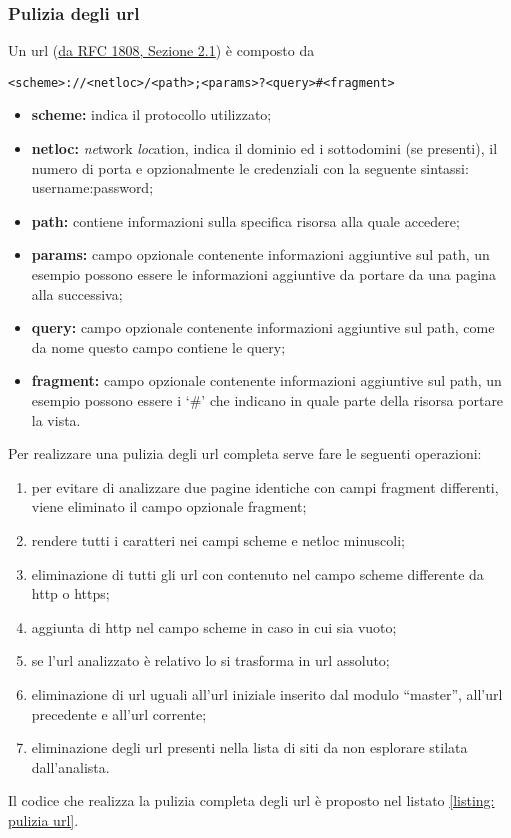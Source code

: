 \subsubsection{Pulizia degli url}
Un url (\href{https://datatracker.ietf.org/doc/html/rfc1808.html#section-2.1}{da RFC 1808, Sezione 2.1}) è composto da \newline
\centerline{\texttt{<scheme>://<netloc>/<path>;<params>?<query>\#<fragment>}}
\newline
\begin{itemize}
	\item \textbf{scheme:} indica il protocollo utilizzato;
	\item \textbf{netloc:} \textit{ne}twork \textit{loc}ation, indica il dominio ed i sottodomini (se presenti), il numero di porta e opzionalmente le credenziali con la seguente sintassi: username:password;
	\item \textbf{path:} contiene informazioni sulla specifica risorsa alla quale accedere;
	\item \textbf{params:} campo opzionale contenente informazioni aggiuntive sul path, un esempio possono essere le informazioni aggiuntive da portare da una pagina alla successiva;
	\item \textbf{query:} campo opzionale contenente informazioni aggiuntive sul path, come da nome questo campo contiene le query;
	\item \textbf{fragment:} campo opzionale contenente informazioni aggiuntive sul path, un esempio possono essere i `\#’ che indicano in quale parte della risorsa portare la vista.
\end{itemize}
\noindent
Per realizzare una pulizia degli url completa serve fare le seguenti operazioni:
\begin{enumerate}
	\item per evitare di analizzare due pagine identiche con campi fragment differenti, viene eliminato il campo opzionale fragment;
	\item rendere tutti i caratteri nei campi scheme e netloc minuscoli;
	\item eliminazione di tutti gli url con contenuto nel campo scheme differente da http o https;
	\item aggiunta di http nel campo scheme in caso in cui sia vuoto;
	\item se l’url analizzato è relativo lo si trasforma in url assoluto;
	\item eliminazione di url uguali all’url iniziale inserito dal modulo ``master'', all’url precedente e all’url corrente;
	\item eliminazione degli url presenti nella lista di siti da non esplorare stilata dall’analista.
\end{enumerate}
Il codice che realizza la pulizia completa degli url è proposto nel listato \ref{listing: pulizia url}.

